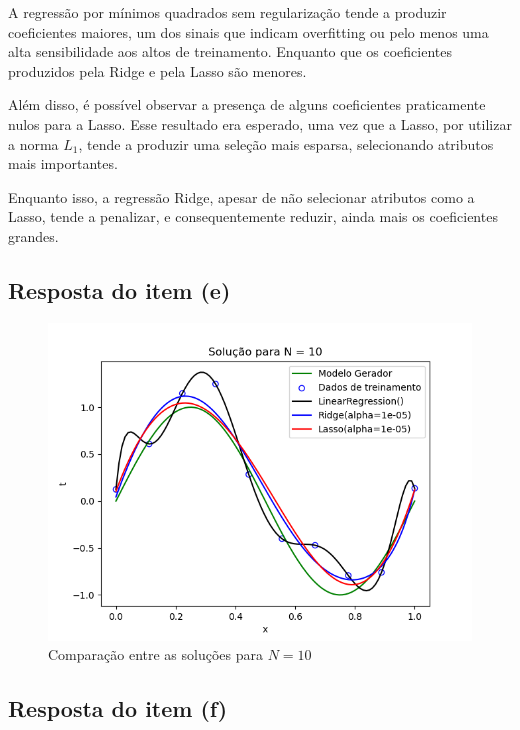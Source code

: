 A regressão por mínimos quadrados sem regularização tende a produzir coeficientes maiores, um dos sinais que indicam overfitting ou pelo menos uma alta sensibilidade aos altos de treinamento. Enquanto que os coeficientes produzidos pela Ridge e pela Lasso são menores.

Além disso, é possível observar a presença de alguns coeficientes praticamente nulos para a Lasso. Esse resultado era esperado, uma vez que a Lasso, por utilizar a norma $L_1$, tende a produzir uma seleção mais esparsa, selecionando atributos mais importantes.

Enquanto isso, a regressão Ridge, apesar de não selecionar atributos como a Lasso, tende a penalizar, e consequentemente reduzir, ainda mais os coeficientes grandes.



\subsection{Resposta do item (e)}
\begin{figure}[H]
    \centering
    \caption{Comparação entre as soluções para $N=10$}
    \includegraphics[width=12cm]{E1_e.png}
\end{figure}

\subsection{Resposta do item (f)}

